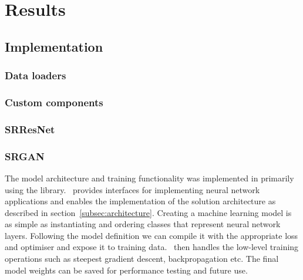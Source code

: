 \chapter{Results}
\label{chapter3}

\section{Implementation}

\subsection{Data loaders}

\subsection{Custom  components}

\subsection{SRResNet}

\subsection{SRGAN}
The model architecture and training functionality was implemented in  primarily using the  library.\  provides interfaces for implementing neural network applications and enables the implementation of the solution architecture as described in section~\ref{subsec:architecture}. Creating a machine learning model is as simple as instantiating and ordering  classes that represent neural network layers. Following the model definition we can compile it with the appropriate loss and optimiser and expose it to training data.\  then handles the low-level training operations such as steepest gradient descent, backpropagation etc. The final model weights can be saved for performance testing and future use.

